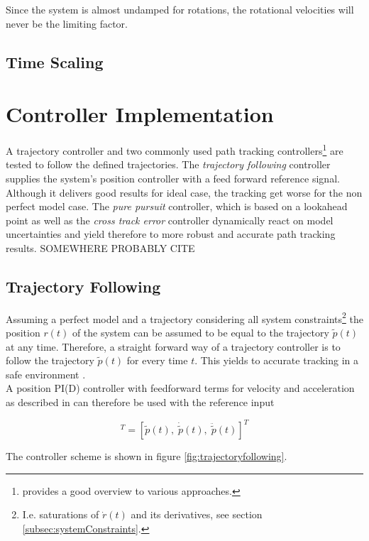 Since the system is almost undamped for rotations, the rotational velocities will never be the limiting factor.

\subsection{Time Scaling}
\label{subsec:timeScaling}

\section{Controller Implementation}
\label{sec:controllerImplementation}
A trajectory controller and two commonly used path tracking controllers\footnote{\cite{snider} provides a good overview to various approaches.} are tested to follow the defined trajectories. The \textit{trajectory following} controller supplies the system's position controller \cite{meiermueri} with a feed forward reference signal. Although it delivers good results for ideal case, the tracking get worse for the non perfect model case. The \textit{pure pursuit} controller, which is based on a lookahead point as well as the \textit{cross track error} controller dynamically react on model uncertainties and yield therefore to more robust and accurate path tracking results.
SOMEWHERE PROBABLY CITE \cite{deluca}
\subsection{Trajectory Following}
Assuming a perfect model and a trajectory considering all system constraints\footnote{I.e. saturations of $\dot{r}(t)$ and its derivatives, see section \ref{subsec:systemConstraints}.} the position $r\left(t\right)$ of the system can be assumed to be equal to the trajectory $\tilde{p}(t)$ at any time. Therefore, a straight forward way of a trajectory controller is to follow the trajectory $\tilde{p}(t)$ for every time $t$. This yields to accurate tracking in a safe environment \cite{doesegger}.
\\
A position PI(D) controller with feedforward terms for velocity and acceleration as described in \cite{meiermueri} can therefore be used with the reference input

\begin{equation}
  [r_{ref}(t), \; \dot{r}_{ref}(t), \; \ddot{r}_{ref}(t)]^T = [\tilde{p}(t), \; \dot{\tilde{p}}(t), \; \ddot{\tilde{p}}(t)]^T
\end{equation}

The controller scheme is shown in figure \ref{fig:trajectoryfollowing}. 

